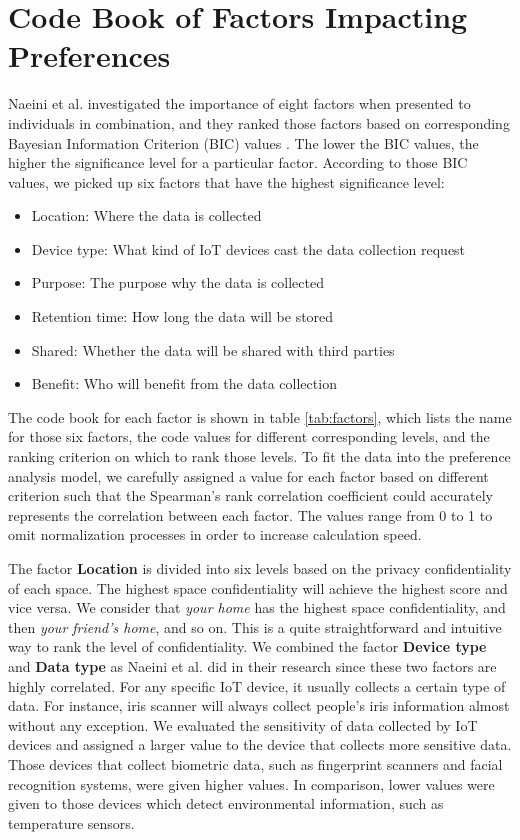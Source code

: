 \documentclass[msc,deptreport,ai]{infthesis}      %
\begin{document}
\section{Code Book of Factors Impacting Preferences}
\label{section:code book}

Naeini et al. investigated the importance of eight factors when presented to individuals in combination, and they ranked those factors based on corresponding Bayesian Information Criterion (BIC) values \cite{Naeini:2017}. The lower the BIC values, the higher the significance level for a particular factor. According to those BIC values, we picked up six factors that have the highest significance level: 
\begin{itemize}
    \item Location: Where the data is collected
    \item Device type: What kind of IoT devices cast the data collection request
    \item Purpose: The purpose why the data is collected
    \item Retention time: How long the data will be stored
    \item Shared: Whether the data will be shared with third parties
    \item Benefit: Who will benefit from the data collection
\end{itemize} 


The code book for each factor is shown in table \ref{tab:factors}, which lists the name for those six factors, the code values for different corresponding levels, and the ranking criterion on which to rank those levels. To fit the data into the preference analysis model, we carefully assigned a value for each factor based on different criterion such that the Spearman's rank correlation coefficient could accurately represents the correlation between each factor. The values range from 0 to 1 to omit normalization processes in order to increase calculation speed.

The factor \textbf{Location} is divided into six levels based on the privacy confidentiality of each space. The highest space confidentiality will achieve the highest score and vice versa. We consider that \textit{your home} has the highest space confidentiality, and then \textit{your friend's home}, and so on. This is a quite straightforward and intuitive way to rank the level of confidentiality. We combined the factor \textbf{Device type} and \textbf{Data type} as Naeini et al. did in their research \cite{Naeini:2017} since these two factors are highly correlated. For any specific IoT device, it usually collects a certain type of data. For instance, iris scanner will always collect people's iris information almost without any exception. We evaluated the sensitivity of data collected by IoT devices and assigned a larger value to the device that collects more sensitive data. Those devices that collect biometric data, such as fingerprint scanners and facial recognition systems, were given higher values. In comparison, lower values were given to those devices which detect environmental information, such as temperature sensors.
\end{document}
